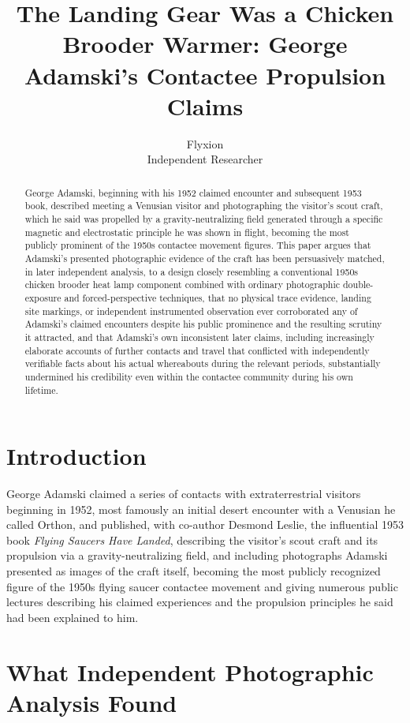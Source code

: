 \documentclass[11pt]{article}
\title{The Landing Gear Was a Chicken Brooder Warmer: George Adamski's Contactee Propulsion Claims}
\author{Flyxion \\ \small Independent Researcher}
\date{}
\begin{document}
\maketitle

\begin{abstract}
George Adamski, beginning with his 1952 claimed encounter and subsequent 1953 book, described meeting a Venusian visitor and photographing the visitor's scout craft, which he said was propelled by a gravity-neutralizing field generated through a specific magnetic and electrostatic principle he was shown in flight, becoming the most publicly prominent of the 1950s contactee movement figures. This paper argues that Adamski's presented photographic evidence of the craft has been persuasively matched, in later independent analysis, to a design closely resembling a conventional 1950s chicken brooder heat lamp component combined with ordinary photographic double-exposure and forced-perspective techniques, that no physical trace evidence, landing site markings, or independent instrumented observation ever corroborated any of Adamski's claimed encounters despite his public prominence and the resulting scrutiny it attracted, and that Adamski's own inconsistent later claims, including increasingly elaborate accounts of further contacts and travel that conflicted with independently verifiable facts about his actual whereabouts during the relevant periods, substantially undermined his credibility even within the contactee community during his own lifetime.
\end{abstract}

\section{Introduction}

George Adamski claimed a series of contacts with extraterrestrial visitors beginning in 1952, most famously an initial desert encounter with a Venusian he called Orthon, and published, with co-author Desmond Leslie, the influential 1953 book \emph{Flying Saucers Have Landed}, describing the visitor's scout craft and its propulsion via a gravity-neutralizing field, and including photographs Adamski presented as images of the craft itself, becoming the most publicly recognized figure of the 1950s flying saucer contactee movement and giving numerous public lectures describing his claimed experiences and the propulsion principles he said had been explained to him.

\section{What Independent Photographic Analysis Found}
\end{document}
